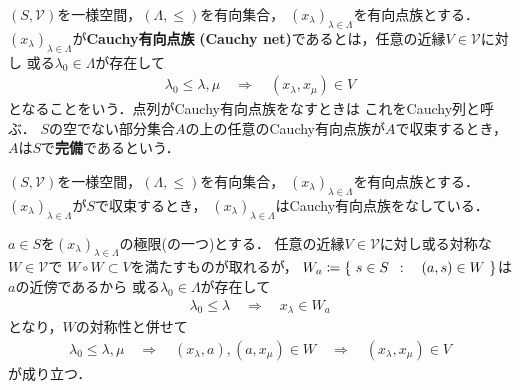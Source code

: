 	\begin{screen}
		\begin{dfn}
			$(S,\mathscr{V})$を一様空間，$(\Lambda,\leq)$を有向集合，
			$(x_\lambda)_{\lambda \in \Lambda}$を有向点族とする．
			$(x_\lambda)_{\lambda \in \Lambda}$が{\bf Cauchy有向点族}
			{\bf (Cauchy net)}であるとは，任意の近縁$V \in \mathscr{V}$に対し
			或る$\lambda_0 \in \Lambda$が存在して
			\begin{align}
				\lambda_0 \leq \lambda,\mu
				\quad \Longrightarrow \quad
				(x_\lambda,x_\mu) \in V
			\end{align}
			となることをいう．点列がCauchy有向点族をなすときは
			これをCauchy列と呼ぶ．
			$S$の空でない部分集合$A$の上の任意のCauchy有向点族が$A$で収束するとき，
			$A$は$S$で{\bf 完備}であるという．
		\end{dfn}
	\end{screen}
	
	\begin{screen}
		\begin{thm}[収束する有向点族はCauchy有向点族]\label{thm:convergent_net_is_Cauchy}
			$(S,\mathscr{V})$を一様空間，$(\Lambda,\leq)$を有向集合，
			$(x_\lambda)_{\lambda \in \Lambda}$を有向点族とする．
			$(x_\lambda)_{\lambda \in \Lambda}$が$S$で収束するとき，
			$(x_\lambda)_{\lambda \in \Lambda}$はCauchy有向点族をなしている．
		\end{thm}
	\end{screen}
	
	\begin{prf}
		$a \in S$を$(x_\lambda)_{\lambda \in \Lambda}$の極限(の一つ)とする．
		任意の近縁$V \in \mathscr{V}$に対し或る対称な$W \in \mathscr{V}$で
		$W \circ W \subset V$を満たすものが取れるが，
		$W_a \coloneqq \left\{\ s \in S\ \, : \quad (a,s) \in W\ \right\}$は$a$の近傍であるから
		或る$\lambda_0 \in \Lambda$が存在して
		\begin{align}
			\lambda_0 \leq \lambda \quad \Longrightarrow \quad
			x_\lambda \in W_a
		\end{align}
		となり，$W$の対称性と併せて
		\begin{align}
			\lambda_0 \leq \lambda,\mu \quad \Longrightarrow \quad
			(x_\lambda,a),(a,x_\mu) \in W \quad \Longrightarrow \quad
			(x_\lambda,x_\mu) \in V
		\end{align}
		が成り立つ．
		\QED
	\end{prf}
	
